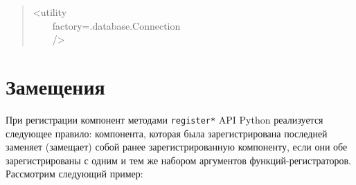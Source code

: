 \documentclass[14pt,a4paper,openany,twoside,final]{extbook}
\begin{document}
\begin{quote}{\ttfamily \raggedright \noindent
<utility\\
~~~~factory=\textquotedbl{}.database.Connection\textquotedbl{}\\
~~~~/>
}
\end{quote}


\section{Замещения%
  \label{id48}%
}

При регистрации компонент методами \texttt{register*} API Python
реализуется следующее правило: компонента, которая была
зарегистрирована последней заменяет (замещает) собой ранее зарегистрированную
компоненту, если они обе зарегистрированы с одним и тем же набором
аргументов функций-регистраторов.  Рассмотрим следующий пример:
\end{document}
